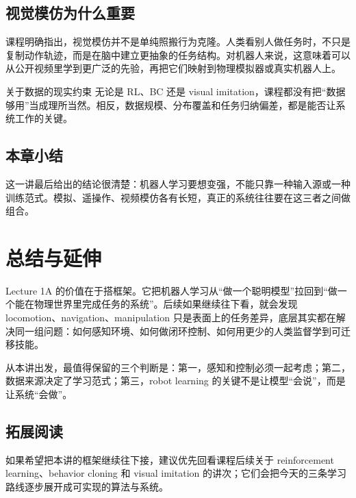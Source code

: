 \documentclass[a4paper]{article}
\begin{document}
\subsection{视觉模仿为什么重要}
课程明确指出，视觉模仿并不是单纯照搬行为克隆。人类看别人做任务时，不只是复制动作轨迹，而是在脑中建立更抽象的任务结构。对机器人来说，这意味着可以从公开视频里学到更广泛的先验，再把它们映射到物理模拟器或真实机器人上。

\begin{warningbox}{关于数据的现实约束}
无论是 RL、BC 还是 visual imitation，课程都没有把“数据够用”当成理所当然。相反，数据规模、分布覆盖和任务归纳偏差，都是能否让系统工作的关键。
\end{warningbox}

\subsection{本章小结}
这一讲最后给出的结论很清楚：机器人学习要想变强，不能只靠一种输入源或一种训练范式。模拟、遥操作、视频模仿各有长短，真正的系统往往要在这三者之间做组合。

\section{总结与延伸}
Lecture 1A 的价值在于搭框架。它把机器人学习从“做一个聪明模型”拉回到“做一个能在物理世界里完成任务的系统”。后续如果继续往下看，就会发现 locomotion、navigation、manipulation 只是表面上的任务差异，底层其实都在解决同一组问题：如何感知环境、如何做闭环控制、如何用更少的人类监督学到可迁移技能。

从本讲出发，最值得保留的三个判断是：第一，感知和控制必须一起考虑；第二，数据来源决定了学习范式；第三，robot learning 的关键不是让模型“会说”，而是让系统“会做”。

\subsection{拓展阅读}
如果希望把本讲的框架继续往下接，建议优先回看课程后续关于 reinforcement learning、behavior cloning 和 visual imitation 的讲次；它们会把今天的三条学习路线逐步展开成可实现的算法与系统。
\end{document}
